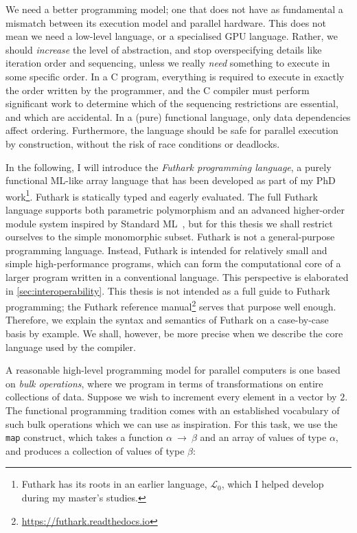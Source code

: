 We need a better programming model; one that does not have as
fundamental a mismatch between its execution model and parallel
hardware.  This does not mean we need a low-level language, or a
specialised GPU language.  Rather, we should \textit{increase} the
level of abstraction, and stop overspecifying details like iteration
order and sequencing, unless we really \textit{need} something to
execute in some specific order.  In a C program, everything is
required to execute in exactly the order written by the programmer,
and the C compiler must perform significant work to determine which
of the sequencing restrictions are essential, and which are
accidental.  In a (pure) functional language, only data dependencies
affect ordering.  Furthermore, the language should be safe for
parallel execution by construction, without the risk of race
conditions or deadlocks.

In the following, I will introduce the \textit{Futhark programming
  language}, a purely functional ML-like array language that has been
developed as part of my PhD work\footnote{Futhark has its roots in an
  earlier language, $\mathcal{L}_0$, which I helped develop during my
  master's studies.}.  Futhark is statically typed and eagerly
evaluated.  The full Futhark language supports both parametric
polymorphism and an advanced higher-order module system inspired by
Standard ML~\cite{Milner:1997:DSM:549659}, but for this thesis we
shall restrict ourselves to the simple monomorphic subset.  Futhark is
not a general-purpose programming language. Instead, Futhark is
intended for relatively small and simple high-performance programs,
which can form the computational core of a larger program written in a
conventional language.  This perspective is elaborated in
\cref{sec:interoperability}.  This thesis is not intended as a full
guide to Futhark programming; the Futhark reference
manual\footnote{\url{https://futhark.readthedocs.io}} serves that
purpose well enough.  Therefore, we explain the syntax and semantics
of Futhark on a case-by-case basis by example.  We shall, however, be
more precise when we describe the core language used by the compiler.

A reasonable high-level programming model for parallel computers is
one based on \textit{bulk operations}, where we program in terms of
transformations on entire collections of data.  Suppose we wish to
increment every element in a vector by $2$.  The functional
programming tradition comes with an established vocabulary of such
bulk operations which we can use as inspiration.  For this task, we
use the \lstinline{map} construct, which takes a function
$\alpha~\rightarrow~\beta$ and an array of values of type $\alpha$,
and produces a collection of values of type $\beta$:

